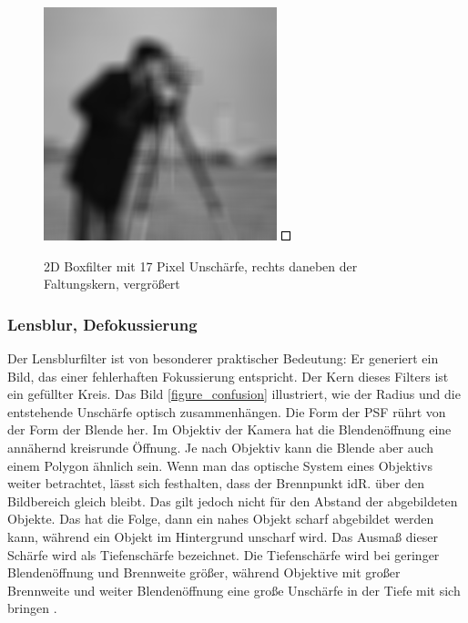 \documentclass[a4paper,12pt]{article}
\begin{document}
\begin{figure}[htbp]
\centering
\includegraphics[scale=0.8]{box17.png}
\includegraphics[scale=7]{kern2D9mal9.png}
\caption{2D Boxfilter mit 17 Pixel Unschärfe, rechts daneben der Faltungskern,
vergrößert}
\label{figure_motion2d}
\end{figure}


\subsubsection{Lensblur, Defokussierung}

Der Lensblurfilter ist von besonderer praktischer Bedeutung: Er generiert ein
Bild, das einer fehlerhaften Fokussierung entspricht. Der Kern dieses Filters
ist ein gefüllter Kreis. Das Bild \ref{figure_confusion} illustriert, wie der Radius und die
entstehende Unschärfe optisch zusammenhängen. Die Form der PSF rührt von der
Form der Blende her. Im Objektiv der Kamera hat die Blendenöffnung eine
annähernd kreisrunde Öffnung. Je nach Objektiv kann die Blende aber auch einem
Polygon ähnlich sein. Wenn man das optische System eines
Objektivs weiter betrachtet, lässt sich festhalten, dass der Brennpunkt idR. über den Bildbereich
gleich bleibt. Das gilt jedoch nicht für den Abstand der abgebildeten Objekte.
Das hat die Folge, dann ein nahes Objekt scharf abgebildet werden kann, während
ein Objekt im Hintergrund unscharf wird. Das Ausmaß dieser Schärfe wird als
Tiefenschärfe bezeichnet. Die Tiefenschärfe wird bei geringer Blendenöffnung
und Brennweite größer, während Objektive mit großer Brennweite und
weiter Blendenöffnung eine große Unschärfe in der Tiefe mit sich bringen
\cite{fotografie}.
\end{document}
